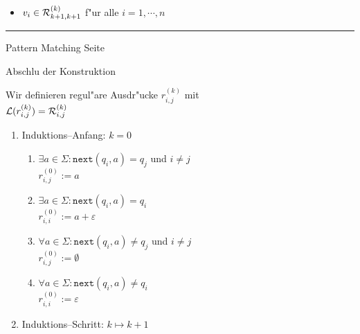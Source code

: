 \begin{slide}{}
\begin{enumerate}
\begin{enumerate}
\begin{itemize}
       \item $v_i \in {\cal R}_{k+1,k+1}^{(k)}$ f"ur alle $i=1,\cdots,n$
       \end{itemize}
     \end{enumerate}
\end{enumerate}


\vspace*{\fill}
\tiny \addtocounter{mypage}{1}
\rule{17cm}{1mm}
Pattern Matching \hspace*{\fill} Seite 
\end{slide}


\begin{slide}{}
\normalsize

\begin{center}
  Abschlu\3 der Konstruktion
\end{center}

\footnotesize
Wir definieren regul"are Ausdr"ucke $r_{i,j}^{(k)}$ mit \\[0.3cm]
\hspace*{1.3cm} ${\cal L}(r_{i,j}^{(k)}) = {\cal R}_{i,j}^{(k)}$

\begin{enumerate}
\item Induktions--Anfang: $k=0$
  \begin{enumerate}
  \item $\exists a \in \Sigma:\mathtt{next}(q_i, a) = q_j$ und $i \not= j$ \\[0.3cm]
        \hspace*{1.3cm} $r_{i,j}^{(0)} := a$
  \item $\exists a \in \Sigma:\mathtt{next}(q_i, a) = q_i$  \\[0.3cm]
        \hspace*{1.3cm} $r_{i,i}^{(0)} := a + \varepsilon$
  \item $\forall a \in \Sigma:\mathtt{next}(q_i, a) \not= q_j$ und $i\not=j$ \\[0.3cm]
        \hspace*{1.3cm} $r_{i,j}^{(0)} := \emptyset$
  \item $\forall a \in \Sigma:\mathtt{next}(q_i, a) \not= q_i$ \\[0.3cm]
        \hspace*{1.3cm} $r_{i,i}^{(0)} := \varepsilon$
  \end{enumerate}
\item Induktions--Schritt: $k \mapsto k + 1$ 


\end{enumerate}
\end{slide}
